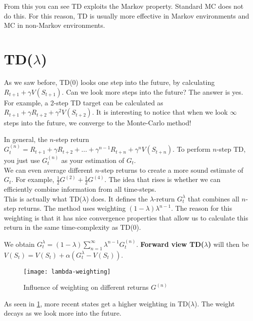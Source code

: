 From this you can see TD exploits the Markov property. Standard MC does not do this. For this reason, TD is usually more effective in Markov environments and MC in non-Markov environments.

\section{TD($\lambda$)}

As we saw before, TD(0) looks one step into the future, by calculating $R_{t+1} + \gamma V(S_{t+1})$. Can we look more steps into the future? The answer is yes. For example, a 2-step TD target can be calculated as $R_{t+1} + \gamma R_{t+2} + \gamma^2 V(S_{t+2})$. It is interesting to notice that when we look $\infty$ steps into the future, we converge to the Monte-Carlo method!

In general, the $n$-step return $G^{(n)}_t = R_{t+1} + \gamma R_{t+2} + ... + \gamma^{n-1} R_{t+n} + \gamma^n V(S_{t+n})$. To perform $n$-step TD, you just use $G^{(n)}_t$ as your estimation of $G_t$.\\

We can even average different $n$-step returns to create a more sound estimate of $G_t$. For example, $\frac{1}{2} G^{(2)} + \frac{1}{2} G^{(4)}$. The idea that rises is whether we can efficiently combine information from all time-steps.\\

This is actually what TD($\lambda$) does. It defines the $\lambda$-return $G^\lambda_t$ that combines all $n$-step returns. The method uses weighting $(1 - \lambda)\lambda^{n - 1}$. The reason for this weighting is that it has nice convergence properties that allow us to calculate this return in the same time-complexity as TD(0).

We obtain $G^\lambda_t = (1-\lambda) \sum^\infty_{n = 1} \lambda^{n-1} G_t^{(n)}$. \textbf{Forward view TD($\lambda$)} will then be $V(S_t) = V(S_t) + \alpha (G^\lambda_t - V(S_t))$.

\begin{figure}[H]
	\centering
	\texttt{[image: lambda-weighting]}
	\caption{Influence of weighting on different returns $G^{(n)}$}
	\label{fig:lambda-weighting}
\end{figure}

As seen in \ref{fig:lambda-weighting}, more recent states get a higher weighting in TD($\lambda$). The weight decays as we look more into the future.\\

